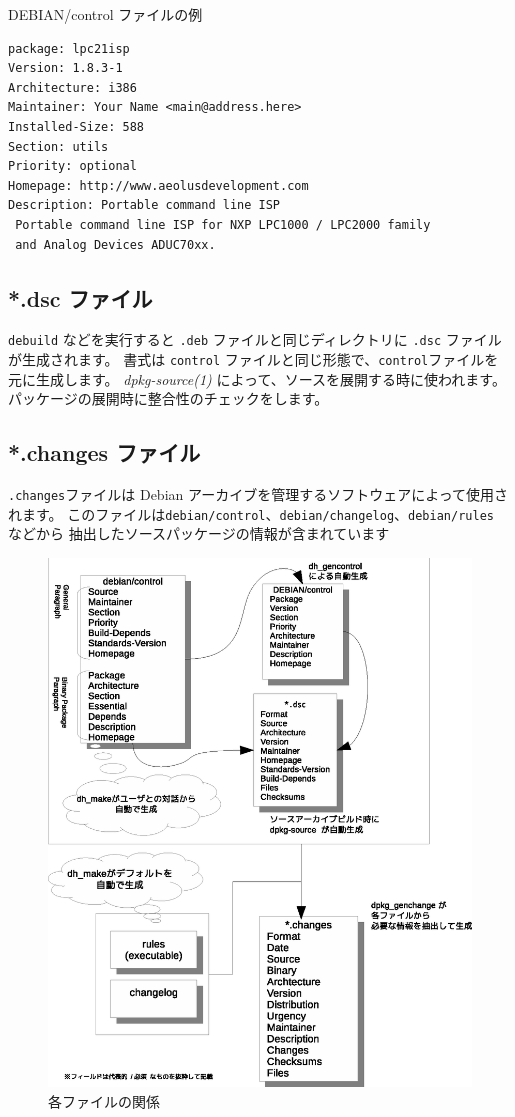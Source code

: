 \documentclass[mingoth,a4paper]{jsarticle}
\begin{document}
\begin{itembox}[l]{DEBIAN/control ファイルの例}
\begin{verbatim}
package: lpc21isp
Version: 1.8.3-1
Architecture: i386
Maintainer: Your Name <main@address.here>
Installed-Size: 588
Section: utils
Priority: optional
Homepage: http://www.aeolusdevelopment.com
Description: Portable command line ISP
 Portable command line ISP for NXP LPC1000 / LPC2000 family
 and Analog Devices ADUC70xx.
\end{verbatim}
\end{itembox}

\subsection{*.dsc ファイル}
{\tt debuild} などを実行すると {\tt *.deb} ファイルと同じディレクトリに {\tt *.dsc}
ファイルが生成されます。
書式は {\tt control} ファイルと同じ形態で、{\tt control}ファイルを元に生成します。
{\it dpkg-source(1)} によって、ソースを展開する時に使われます。
パッケージの展開時に整合性のチェックをします。

\subsection{*.changes ファイル}
{\tt .changes}ファイルは Debian アーカイブを管理するソフトウェアによって使用されます。
このファイルは{\tt debian/control}、{\tt debian/changelog}、{\tt debian/rules} などから
抽出したソースパッケージの情報が含まれています

\begin{figure}[ht]
    \centering
    \includegraphics[width=.9\textwidth]{image201203/control.eps}
 \caption{各ファイルの関係}
\end{figure}
\end{document}
